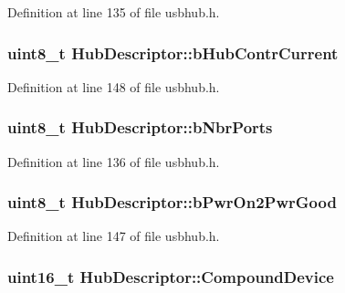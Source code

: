 \-Definition at line 135 of file usbhub.\-h.

\hypertarget{struct_hub_descriptor_a454ce905f8af25625156fbeb729d53b7}{
\subsubsection[{b\-Hub\-Contr\-Current}]{\setlength{\rightskip}{0pt plus 5cm}uint8\-\_\-t {\bf \-Hub\-Descriptor\-::b\-Hub\-Contr\-Current}}}\label{struct_hub_descriptor_a454ce905f8af25625156fbeb729d53b7}


\-Definition at line 148 of file usbhub.\-h.

\hypertarget{struct_hub_descriptor_a8519ab446f0bdb69c33cd89b553da30b}{
\subsubsection[{b\-Nbr\-Ports}]{\setlength{\rightskip}{0pt plus 5cm}uint8\-\_\-t {\bf \-Hub\-Descriptor\-::b\-Nbr\-Ports}}}\label{struct_hub_descriptor_a8519ab446f0bdb69c33cd89b553da30b}


\-Definition at line 136 of file usbhub.\-h.

\hypertarget{struct_hub_descriptor_a670882df710639db15249ee9a956b664}{
\subsubsection[{b\-Pwr\-On2\-Pwr\-Good}]{\setlength{\rightskip}{0pt plus 5cm}uint8\-\_\-t {\bf \-Hub\-Descriptor\-::b\-Pwr\-On2\-Pwr\-Good}}}\label{struct_hub_descriptor_a670882df710639db15249ee9a956b664}


\-Definition at line 147 of file usbhub.\-h.

\hypertarget{struct_hub_descriptor_a3547643d0dfd8f16145229c530a8c1a5}{
\subsubsection[{\-Compound\-Device}]{\setlength{\rightskip}{0pt plus 5cm}uint16\-\_\-t {\bf \-Hub\-Descriptor\-::\-Compound\-Device}}}\label{struct_hub_descriptor_a3547643d0dfd8f16145229c530a8c1a5}


